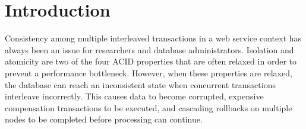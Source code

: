 \chapter{Introduction}\label{chap:intro}

Consistency among multiple interleaved transactions in a web service context has always been an issue for researchers and database administrators. Isolation and atomicity are two of the four \ac{ACID} properties that are often relaxed in order to prevent a performance bottleneck. However, when these properties are relaxed, the database can reach an inconsistent state when concurrent transactions interleave incorrectly. This causes data to become corrupted, expensive compensation transactions to be executed, and cascading rollbacks on multiple nodes to be completed before processing can continue. 




